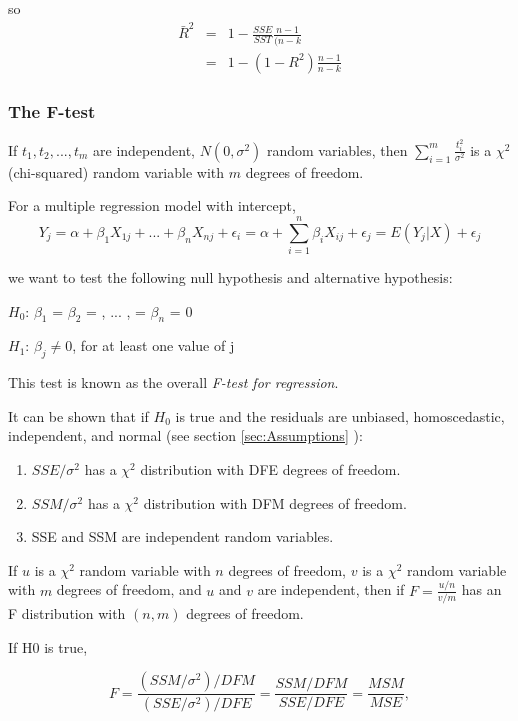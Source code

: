    so
\begin{eqnarray}
  \bar{R}^2 &=& 1 - \frac{SSE}{SST} \frac{n - 1}{(n - k} \\
    &=& 1 - (1 - R^2)\frac{n - 1}{n - k}
\end{eqnarray}


\subsubsection{The F-test}

If $t_1, t_2, ... , t_m$ are independent, $N(0, \sigma^2)$ random variables, then $\sum_{i=1}^m \frac{t_i^2}{\sigma^2}$ is a $\chi^2$ (chi-squared) random variable with $m$ degrees of freedom.

For a multiple regression model with intercept,
\begin{equation}
  Y_j = \alpha + \beta_1 X_{1j} + ... + \beta_n X_{nj} + \epsilon_i = \alpha + \sum_{i=1}^n \beta_i X_{ij} + \epsilon_j = E(Y_j | X) + \epsilon_j
\end{equation}

we want to test the following null hypothesis and alternative hypothesis:

        $H_0$:   $\beta_1$ = $\beta_2$ = , ... , = $\beta_n$ = 0

        $H_1$:   $\beta_j \neq 0$, for at least one value of j

This test is known as the overall \emph{F-test for regression}.

It can be shown that if $H_0$ is true and the residuals are unbiased, homoscedastic, independent, and normal (see section \ref{sec:Assumptions} ):

\begin{enumerate}
  \item $SSE / \sigma^2$ has a $\chi^2$ distribution with DFE degrees of freedom.
  \item $SSM / \sigma^2$ has a $\chi^2$ distribution with DFM degrees of freedom.
  \item SSE and SSM are independent random variables.
\end{enumerate}

If $u$ is a $\chi^2$ random variable with $n$ degrees of freedom, $v$ is a $\chi^2$ random variable with $m$ degrees of freedom, and $u$ and $v$ are independent, then if $F = \frac{u/n}{v/m}$ has an F distribution with $(n,m)$ degrees of freedom.

If H0 is true,

\begin{equation}
  F = \frac{(SSM/\sigma^2)/DFM}{(SSE/\sigma^2)/DFE} = \frac{SSM/DFM}{SSE/DFE} = \frac{MSM}{MSE},
\end{equation}

